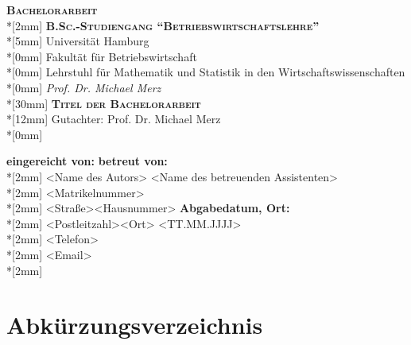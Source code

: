 \documentclass[
  11pt,
  letterpaper,
  DIV=11,
  numbers=noendperiod]{scrartcl}
\numberwithin{equation}{section} %
\begin{document}
\begin{titlepage}
\begin{center}                     
        {\Large\scshape \textbf{Bachelorarbeit}}\\*[2mm]
				{\Large\scshape \textbf{B.Sc.-Studiengang "`Betriebswirtschaftslehre"'}}\\*[5mm]
				{\large Universität Hamburg}\\*[0mm]
				{\large Fakultät für Betriebswirtschaft}\\*[0mm]
				{\large Lehrstuhl für Mathematik und Statistik in den Wirtschaftswissenschaften}\\*[0mm]
				{\large \emph{Prof. Dr. Michael Merz}}\\*[30mm]
        {\bf \LARGE\scshape Titel der Bachelorarbeit}\\*[12mm]
				{\large Gutachter: Prof. Dr. Michael Merz}\\*[0mm]
\end{center}  
\vspace{5cm}
\begin{tabbing}
       \textbf{eingereicht von:}		\hspace{6.5cm}\=			\textbf{betreut von:}\\*[2mm]
       <Name des Autors>								\> <Name des betreuenden Assistenten>\\*[2mm]		
       <Matrikelnummer>  \\*[2mm]
       <Straße><Hausnummer>										\> \textbf{Abgabedatum, Ort:} \\*[2mm]
       <Postleitzahl><Ort>		   							\> <TT.MM.JJJJ>   \\*[2mm]
       <Telefon> \\*[2mm]
       <Email> \\*[2mm]
\end{tabbing}
\end{titlepage}
\newpage


\setcounter{page}{2}

\tableofcontents
\newpage

\listoffigures
\newpage

\listoftables
\newpage

\section*{Abkürzungsverzeichnis}
\newpage
\end{document}
